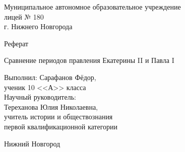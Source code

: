\begin{titlepage}
\newpage

\begin{center}

Муниципальное автономное образовательное учреждение \\
лицей № 180 \\
г. Нижнего Новгорода \\

\end{center}
 

\vspace{14em}

\begin{center}
\large{Реферат}
\end{center}

 
\begin{center}
Сравнение периодов правления Екатерины II и Павла I
\end{center}

\vspace{4.5em}
 
\begin{flushright}
Выполнил: Сарафанов Фёдор, \\
ученик 10 <<А>> класса \\
Научный руководитель: \\
Тереханова Юлия Николаевна, \\
учитель истории и обществознания \\ 
первой квалификационной категории
\end{flushright}
 
\vspace{\fill}

\begin{center}
Нижний Новгород \\
\the\year
\end{center}

\end{titlepage}